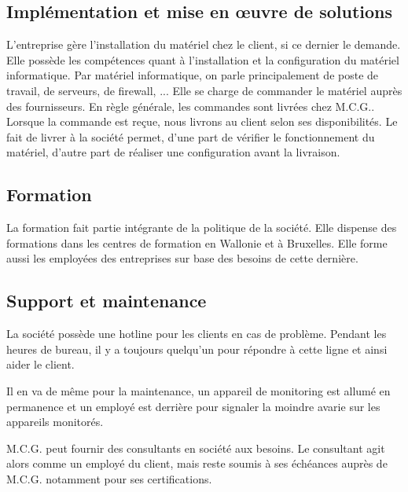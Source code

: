 \subsection*{Implémentation et mise en œuvre de solutions}
L'entreprise gère l'installation du matériel chez le client, si ce dernier le demande.
Elle possède les compétences quant à l'installation et la configuration du matériel informatique.
Par matériel informatique, on parle principalement de poste de travail, de serveurs, de firewall, ...
Elle se charge de commander le matériel auprès des fournisseurs.
En règle générale, les commandes sont livrées chez M.C.G..
Lorsque la commande est reçue, nous livrons au client selon ses disponibilités.
Le fait de livrer à la société permet, d'une part de vérifier le fonctionnement du matériel, d'autre part de réaliser une configuration avant la livraison.

\subsection*{Formation}
La formation fait partie intégrante de la politique de la société.
Elle dispense des formations dans les centres de formation en Wallonie et à Bruxelles. 
Elle forme aussi les employées des entreprises sur base des besoins de cette dernière.

\subsection*{Support et maintenance}
La société possède une hotline pour les clients en cas de problème. 
Pendant les heures de bureau, il y a toujours quelqu'un pour répondre à cette ligne et ainsi aider le client.

Il en va de même pour la maintenance, un appareil de monitoring est allumé en permanence et un employé est derrière pour signaler la moindre avarie sur les appareils monitorés.

M.C.G. peut fournir des consultants en société aux besoins. 
Le consultant agit alors comme un employé du client, mais reste soumis à ses échéances auprès de M.C.G. notamment pour ses certifications.

